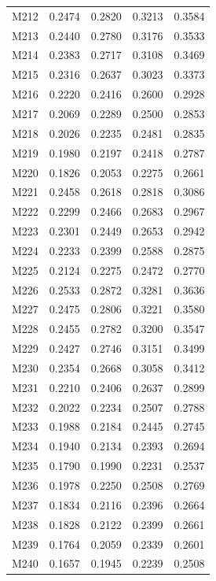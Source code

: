 \begin{longtable}{lrrrr}
M212 & 0.2474 & 0.2820 & 0.3213 & 0.3584 \\
M213 & 0.2440 & 0.2780 & 0.3176 & 0.3533 \\
M214 & 0.2383 & 0.2717 & 0.3108 & 0.3469 \\
M215 & 0.2316 & 0.2637 & 0.3023 & 0.3373 \\
M216 & 0.2220 & 0.2416 & 0.2600 & 0.2928 \\
M217 & 0.2069 & 0.2289 & 0.2500 & 0.2853 \\
M218 & 0.2026 & 0.2235 & 0.2481 & 0.2835 \\
M219 & 0.1980 & 0.2197 & 0.2418 & 0.2787 \\
M220 & 0.1826 & 0.2053 & 0.2275 & 0.2661 \\
M221 & 0.2458 & 0.2618 & 0.2818 & 0.3086 \\
M222 & 0.2299 & 0.2466 & 0.2683 & 0.2967 \\
M223 & 0.2301 & 0.2449 & 0.2653 & 0.2942 \\
M224 & 0.2233 & 0.2399 & 0.2588 & 0.2875 \\
M225 & 0.2124 & 0.2275 & 0.2472 & 0.2770 \\
M226 & 0.2533 & 0.2872 & 0.3281 & 0.3636 \\
M227 & 0.2475 & 0.2806 & 0.3221 & 0.3580 \\
M228 & 0.2455 & 0.2782 & 0.3200 & 0.3547 \\
M229 & 0.2427 & 0.2746 & 0.3151 & 0.3499 \\
M230 & 0.2354 & 0.2668 & 0.3058 & 0.3412 \\
M231 & 0.2210 & 0.2406 & 0.2637 & 0.2899 \\
M232 & 0.2022 & 0.2234 & 0.2507 & 0.2788 \\
M233 & 0.1988 & 0.2184 & 0.2445 & 0.2745 \\
M234 & 0.1940 & 0.2134 & 0.2393 & 0.2694 \\
M235 & 0.1790 & 0.1990 & 0.2231 & 0.2537 \\
M236 & 0.1978 & 0.2250 & 0.2508 & 0.2769 \\
M237 & 0.1834 & 0.2116 & 0.2396 & 0.2664 \\
M238 & 0.1828 & 0.2122 & 0.2399 & 0.2661 \\
M239 & 0.1764 & 0.2059 & 0.2339 & 0.2601 \\
M240 & 0.1657 & 0.1945 & 0.2239 & 0.2508 \\
\end{longtable}
